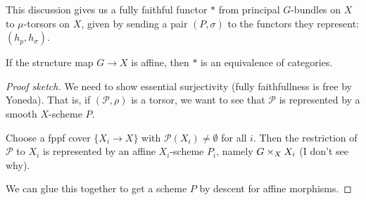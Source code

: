 \documentclass[11pt, english]{article}
\begin{document}
This discussion gives us a fully faithful functor $\ast$ from principal $G$-bundles on $X$ to $\mu$-torsors on $X$, given by sending a pair $(P,\sigma)$ to the functors they represent: $(h_p,h_\sigma)$. 

\begin{prop}
If the structure map $G \to X$ is affine, then $\ast$ is an equivalence of categories.
\end{prop}
\begin{proof}[Proof sketch]
We need to show essential surjectivity (fully faithfullness is free by Yoneda). That is, if $(\mathcal P, \rho)$ is a torsor, we want to see that $\mathcal P$ is represented by a smooth $X$-scheme $P$.

Choose a fppf cover $\{ X_i \to X\}$ with $\mathcal P(X_i) \neq \emptyset$ for all $i$. Then the restriction of $\mathcal P$ to $X_i$ is represented by an affine $X_i$-scheme $P_i$, namely $G \times_X X_i$ (I don't see why).

We can glue this together to get a scheme $P$ by descent for affine morphisms.
\end{proof}
\end{document}
